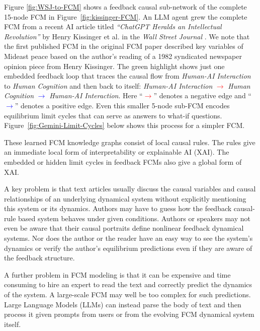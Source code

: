 \documentclass[runningheads]{llncs}
\begin{document}
Figure \ref{fig:WSJ-to-FCM} shows a feedback causal sub-network of the complete 15-node FCM in Figure~\ref{fig:kissinger-FCM}.
 An LLM agent grew the complete FCM from a recent AI article titled \emph{``ChatGPT Heralds an Intellectual Revolution''} by Henry Kissinger et al. in the \emph{Wall Street Journal} \cite{kissinger2023chatgpt}.  
We note that the first published FCM in the original FCM paper \cite{kosko1986fuzzy} described key variables of Mideast peace based on the author's reading of a 1982 syndicated newspaper opinion piece from Henry Kissinger.
The green highlight shows just one embedded feedback loop that traces the causal flow from \emph{Human-AI Interaction} to {\emph{Human Cognition}} and then back to itself:  \emph{Human-AI Interaction} \textcolor{red}{$\rightarrow$} \emph{Human Cognition} \textcolor{blue}{$\rightarrow$} \emph{Human-AI Interaction}. 
Here ``\textcolor{red}{$\rightarrow$}'' denotes a negative edge and ``\textcolor{blue}{$\rightarrow$}'' denotes a positive edge. 
Even this smaller 5-node sub-FCM encodes equilibrium limit cycles that can serve as answers to what-if questions.  
Figure~\ref{fig:Gemini-Limit-Cycles} below shows this process for a simpler FCM.

These learned FCM knowledge graphs consist of local causal rules.  
The rules give an immediate local form of interpretability or explainable AI (XAI)\cite{8466590,guimera2020bayesian,horst2019explaining,samek2019explainable,giamattei2025causal}.  
The embedded or hidden limit cycles in feedback FCMs also give a global form of XAI.



A key problem is that text articles usually discuss the causal variables and causal relationships of an underlying dynamical system without explicitly mentioning this system or its dynamics. 
Authors may have to guess how the feedback causal-rule based system behaves under given conditions.
Authors or speakers may not even be aware that their causal portraits define nonlinear feedback dynamical systems.
Nor does the author or the reader have an easy way to see the system's dynamics or verify the author's equilibrium predictions even if they are aware of the feedback structure. 


A further problem in FCM modeling is that it can be expensive and time consuming to hire an expert to read the text and correctly predict the dynamics of the system.
A large-scale FCM may well be too complex for such predictions. 
Large Language Models (LLMs) can instead parse the body of text and then process it given prompts from users or from the evolving FCM dynamical system itself.
\end{document}
